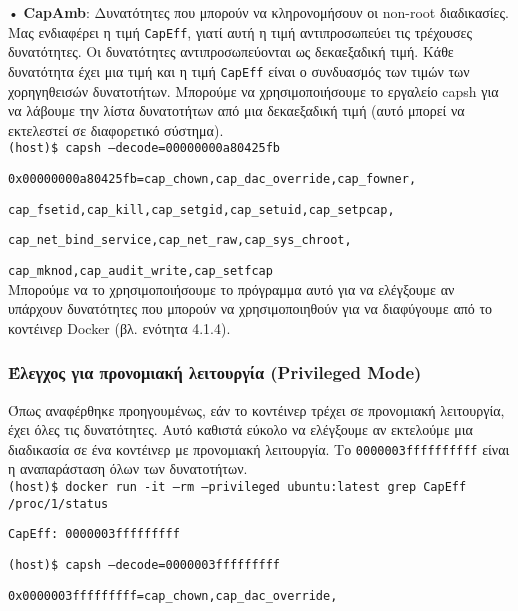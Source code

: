 • \textlatin{\textbf{CapAmb}}: Δυνατότητες που μπορούν να κληρονομήσουν οι
\textlatin{non-root} διαδικασίες. \\


Μας ενδιαφέρει η τιμή \texttt{\textlatin{CapEff}}, γιατί αυτή η τιμή
αντιπροσωπεύει τις τρέχουσες δυνατότητες. Οι δυνατότητες αντιπροσωπεύονται ως
δεκαεξαδική τιμή. Κάθε δυνατότητα έχει μια τιμή και η τιμή
\texttt{\textlatin{CapEff}} είναι ο συνδυασμός
των τιμών των χορηγηθεισών δυνατοτήτων. Μπορούμε να χρησιμοποιήσουμε το εργαλείο
\textlatin{capsh} για να λάβουμε την λίστα δυνατοτήτων από μια δεκαεξαδική τιμή
(αυτό μπορεί να εκτελεστεί σε διαφορετικό σύστημα). \\

\texttt{\textlatin{(host)\$ capsh --decode=00000000a80425fb}}

\texttt{\textlatin{0x00000000a80425fb=cap\_chown,cap\_dac\_override,cap\_fowner,}}

\texttt{\textlatin{cap\_fsetid,cap\_kill,cap\_setgid,cap\_setuid,cap\_setpcap,}}

\texttt{\textlatin{cap\_net\_bind\_service,cap\_net\_raw,cap\_sys\_chroot,}}

\texttt{\textlatin{cap\_mknod,cap\_audit\_write,cap\_setfcap}} \\


Μπορούμε να το χρησιμοποιήσουμε το πρόγραμμα αυτό για να ελέγξουμε αν υπάρχουν
δυνατότητες που μπορούν να χρησιμοποιηθούν για να διαφύγουμε από το κοντέινερ
\textlatin{Docker} (βλ. ενότητα 4.1.4).


\subsubsection{Έλεγχος για προνομιακή λειτουργία (\textlatin{Privileged Mode})}

Όπως αναφέρθηκε προηγουμένως, εάν το κοντέινερ τρέχει σε προνομιακή
λειτουργία, έχει όλες τις δυνατότητες. Αυτό καθιστά εύκολο να ελέγξουμε αν
εκτελούμε μια διαδικασία σε ένα κοντέινερ με προνομιακή λειτουργία.
Το \texttt{\textlatin{0000003ffffffffff}} είναι η αναπαράσταση όλων των
δυνατοτήτων. \\

\texttt{\textlatin{(host)\$ docker run -it --rm --privileged ubuntu:latest grep CapEff /proc/1/status}}

\texttt{\textlatin{CapEff: 0000003fffffffff}}

\texttt{\textlatin{(host)\$ capsh --decode=0000003fffffffff}}

\texttt{\textlatin{0x0000003fffffffff=cap\_chown,cap\_dac\_override,}}

